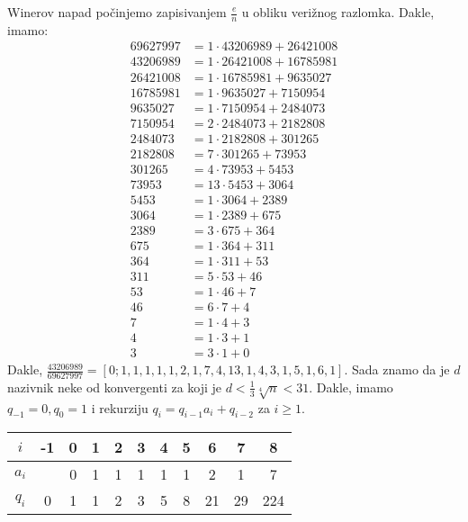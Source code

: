 \documentclass{exam}
\begin{document}
\begin{questions}
\begin{solution}
  Winerov napad počinjemo zapisivanjem $\frac{e}{n}$ u obliku verižnog razlomka. Dakle, imamo:
  \begin{align*}
    69627997 &= 1 \cdot 43206989 + 26421008\\
    43206989 &= 1 \cdot 26421008 + 16785981\\
    26421008 &= 1 \cdot 16785981 + 9635027\\
    16785981 &= 1 \cdot 9635027 + 7150954\\
    9635027 &= 1 \cdot 7150954 + 2484073\\
    7150954 &= 2 \cdot 2484073 + 2182808\\
    2484073 &= 1 \cdot 2182808 + 301265\\
    2182808 &= 7 \cdot 301265 + 73953\\
    301265 &= 4 \cdot 73953 + 5453\\
    73953 &= 13 \cdot 5453 + 3064\\
    5453 &= 1 \cdot 3064 + 2389\\
    3064 &= 1 \cdot 2389 + 675\\
    2389 &= 3 \cdot 675 + 364\\
    675 &= 1 \cdot 364 + 311\\
    364 &= 1 \cdot 311 + 53\\
    311 &= 5 \cdot 53 + 46\\
    53 &= 1 \cdot 46 + 7\\
    46 &= 6 \cdot 7 + 4\\
    7 &= 1 \cdot 4 + 3\\
    4 &= 1 \cdot 3 + 1\\
    3 &= 3 \cdot 1 + 0
  \end{align*}
  Dakle, $\frac{43206989}{69627997} = [0; 1, 1, 1, 1, 1, 2, 1, 7, 4, 13, 1, 4, 3, 1, 5, 1, 6, 1]$. Sada znamo da je $d$ nazivnik neke od konvergenti za koji je $d < \frac{1}{3} \sqrt[4]{n} < 31$. Dakle, imamo $q_{-1} = 0, q_{0} = 1$ i rekurziju $q_i = q_{i-1} a_i + q_{i-2}$ za $i \geq 1$.

  \begin{tabular}{|c|c|c|c|c|c|c|c|c|c|c|}
    \hline
    $i$ & -1 & 0 & 1 & 2 & 3 & 4 & 5 & 6 & 7 & 8\\
    \hline
    $a_i$ & & 0 & 1 & 1 & 1 & 1 & 1 & 2 & 1 & 7\\
    \hline
    $q_i$ & 0 & 1 & 1 & 2 & 3 & 5 & 8 & 21 & 29 & 224\\
    \hline
  \end{tabular}


\end{solution}
\end{questions}
\end{document}
